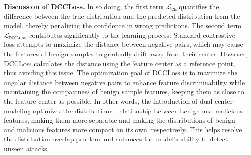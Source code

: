 \textbf{Discussion of DCCLoss.} In so doing, the first term $\mathcal{L}_\mathtt{CE}$ quantifies the difference between the true distribution and the predicted distribution from the model, thereby penalizing the confidence in wrong predictions. The second term $\mathcal{L}_\mathtt{DCCLoss}$ contributes significantly to the learning process. Standard contrastive loss attempts to maximize the distance between negative pairs, which may cause the features of benign samples to gradually drift away from their center. However, DCCLoss calculates the distance using the feature center as a reference point, thus avoiding this issue. The optimization goal of DCCLoss is to maximize the angular distance between negative pairs to enhance feature discriminability while maintaining the compactness of benign sample features, keeping them as close to the feature center as possible. 
In other words, the introduction of dual-center modeling optimizes the distributional relationship between benign and malicious features, making them more separable and making the distributions of benign and malicious features more compact on its own, respectively. This helps resolve the distribution overlap problem and enhances the model's ability to detect unseen attacks.






